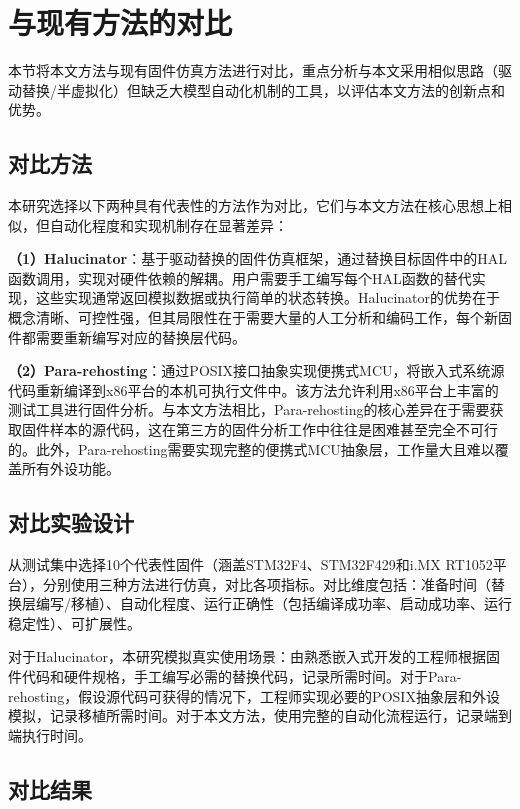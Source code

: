\section{与现有方法的对比}
\label{sec:compare}

本节将本文方法与现有固件仿真方法进行对比，重点分析与本文采用相似思路（驱动替换/半虚拟化）但缺乏大模型自动化机制的工具，以评估本文方法的创新点和优势。

\subsection{对比方法}

本研究选择以下两种具有代表性的方法作为对比，它们与本文方法在核心思想上相似，但自动化程度和实现机制存在显著差异：

\textbf{（1）Halucinator}：基于驱动替换的固件仿真框架，通过替换目标固件中的HAL函数调用，实现对硬件依赖的解耦。用户需要手工编写每个HAL函数的替代实现，这些实现通常返回模拟数据或执行简单的状态转换。Halucinator的优势在于概念清晰、可控性强，但其局限性在于需要大量的人工分析和编码工作，每个新固件都需要重新编写对应的替换层代码。

\textbf{（2）Para-rehosting}：通过POSIX接口抽象实现便携式MCU，将嵌入式系统源代码重新编译到x86平台的本机可执行文件中。该方法允许利用x86平台上丰富的测试工具进行固件分析。与本文方法相比，Para-rehosting的核心差异在于需要获取固件样本的源代码，这在第三方的固件分析工作中往往是困难甚至完全不可行的。此外，Para-rehosting需要实现完整的便携式MCU抽象层，工作量大且难以覆盖所有外设功能。

\subsection{对比实验设计}

从测试集中选择10个代表性固件（涵盖STM32F4、STM32F429和i.MX RT1052平台），分别使用三种方法进行仿真，对比各项指标。对比维度包括：准备时间（替换层编写/移植）、自动化程度、运行正确性（包括编译成功率、启动成功率、运行稳定性）、可扩展性。

对于Halucinator，本研究模拟真实使用场景：由熟悉嵌入式开发的工程师根据固件代码和硬件规格，手工编写必需的替换代码，记录所需时间。对于Para-rehosting，假设源代码可获得的情况下，工程师实现必要的POSIX抽象层和外设模拟，记录移植所需时间。对于本文方法，使用完整的自动化流程运行，记录端到端执行时间。

\subsection{对比结果}

